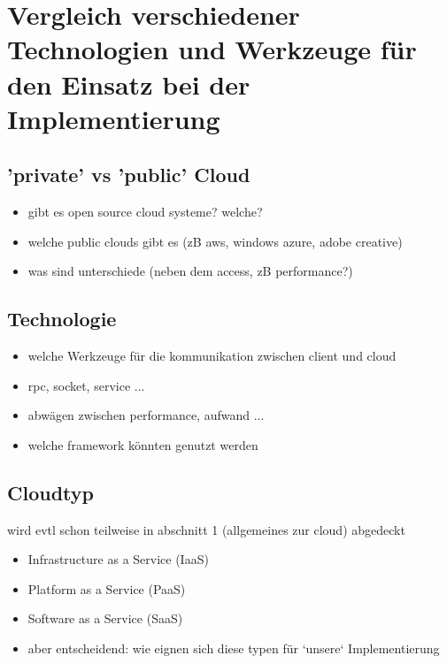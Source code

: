 \documentclass[a4paper,10pt]{article}
\begin{document}
\newpage

\section{Vergleich verschiedener Technologien und Werkzeuge für den Einsatz bei der Implementierung}

\subsection{'private' vs 'public' Cloud}

\begin{itemize}
 \item gibt es open source cloud systeme? welche?
 \item welche public clouds gibt es (zB aws, windows azure, adobe creative)
 \item was sind unterschiede (neben dem access, zB performance?)
\end{itemize}

\subsection{Technologie}

\begin{itemize}
 \item welche Werkzeuge für die kommunikation zwischen client und cloud
 \item rpc, socket, service ...
 \item abwägen zwischen performance, aufwand ...
 \item welche framework könnten genutzt werden
\end{itemize}


\subsection{Cloudtyp}

wird evtl schon teilweise in abschnitt 1 (allgemeines zur cloud) abgedeckt

\begin{itemize}
 \item Infrastructure as a Service (IaaS)
 \item Platform as a Service (PaaS)
 \item Software as a Service (SaaS)
 \item aber entscheidend: wie eignen sich diese typen für `unsere` Implementierung
\end{itemize}
\end{document}
